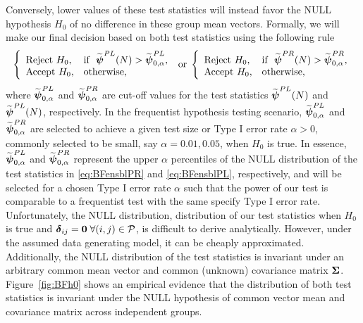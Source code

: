 \documentclass[times,sort&compress,3p]{elsarticle}
\theoremstyle{plain}%
\theoremstyle{definition}
\def\bzero{{\mathbf 0}}
\def\be{\begin{eqnarray}}
\def\ee{\end{eqnarray}}
\def\boldpsi{{\mbox{\boldmath $\psi$}}}
\def\bzero{{\mathbf 0}}
\newcommand{\udelta}            {\mbox{\boldmath$\delta$}}
\newcommand{\uSigma}            {\mbox{\boldmath$\Sigma$}}
\begin{document}
Conversely, lower values of these test statistics will instead favor the NULL hypothesis $H_0$ of no difference in these group mean vectors. Formally, we will make our final decision based on both test statistics using the following rule
{\color{red}
\be
 \left \{
       \begin{array}{llll}
       \mbox{Reject}~ H_{0}, & \mbox{if} ~~ \widetilde{\boldpsi}^{PL}(N) > \widetilde{\boldpsi}^{PL}_{0, \alpha},  \\
       \mbox{Accept}~ H_{0}, & \mbox{otherwise}, %
       \end{array}
       \right. \; \mbox{or}\;
  \left \{
       \begin{array}{llll}
       \mbox{Reject}~ H_{0}, & \mbox{if} ~~ \widetilde{\boldpsi}^{PR}(N) > \widetilde{\boldpsi}^{PR}_{0, \alpha},  \\
       \mbox{Accept}~ H_{0}, & \mbox{otherwise}, \label{eq:eqBFfin}
       \end{array}
       \right.     
\ee
}
where $\widetilde{\boldpsi}^{PL}_{0, \alpha}$ and $\widetilde{\boldpsi}^{PR}_{0, \alpha}$ are  cut-off values for the test statistics $\widetilde{\boldpsi}^{PL}(N)$ and $\widetilde{\boldpsi}^{PL}(N)$, respectively. In the frequentist hypothesis testing scenario, $\widetilde{\boldpsi}^{PL}_{0, \alpha}$ and $\widetilde{\boldpsi}^{PR}_{0, \alpha}$ are selected to achieve a given test size or Type I error rate $\alpha > 0$, commonly selected to be small, say $\alpha  = 0.01, 0.05$, when $H_0$ is true. In essence, $\widetilde{\boldpsi}^{PL}_{0, \alpha}$ and $\widetilde{\boldpsi}^{PR}_{0, \alpha}$ represent the upper $\alpha$ percentiles of the NULL distribution of the test statistics in \eqref{eq:BFensblPR} and \eqref{eq:BFensblPL}, respectively, and will be selected for a chosen Type I error rate $\alpha$ such that the power of our test is comparable to a frequentist test with the same specify Type I error rate.  
Unfortunately, the NULL distribution, distribution of our test statistics when $H_0$ is true and $\udelta_{ij} = \bzero\; \forall(i,j) \in \mathcal{P}$, is difficult to derive analytically. However, under the assumed data generating model, it can be cheaply approximated. Additionally, the NULL distribution of the test statistics is invariant under an arbitrary common mean vector and common (unknown) covariance matrix $\uSigma$. Figure~\ref{fig:BFh0} shows an empirical evidence that the distribution of both test statistics is invariant under the NULL hypothesis of common vector mean and covariance matrix across independent groups. 
\end{document}
